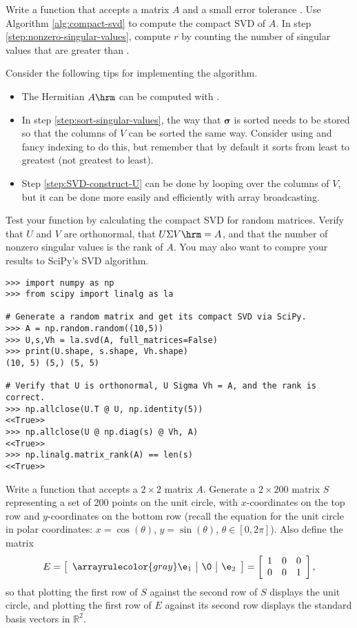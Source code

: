 Write a function that accepts a matrix $A$ and a small error tolerance .
Use Algorithm \ref{alg:compact-svd} to compute the compact SVD of $A$.
In step \ref{step:nonzero-singular-values}, compute $r$ by counting the number of singular values that are greater than .

Consider the following tips for implementing the algorithm.
\begin{itemize}
    \item The Hermitian $A\hrm$ can be computed with .
    \item In step \ref{step:sort-singular-values}, the way that $\boldsymbol{\sigma}$ is sorted needs to be stored so that the columns of $V$ can be sorted the same way.
    Consider using  and fancy indexing to do this, but remember that by default it sorts from least to greatest (not greatest to least).
    \item Step \ref{step:SVD-construct-U} can be done by looping over the columns of $V$, but it can be done more easily and efficiently with array broadcasting.
\end{itemize}

Test your function by calculating the compact SVD for random matrices.
Verify that $U$ and $V$ are orthonormal, that $U\Sigma V\hrm = A$, and that the number of nonzero singular values is the rank of $A$.
You may also want to compre your results to SciPy's SVD algorithm.
%
\begin{lstlisting}
>>> import numpy as np
>>> from scipy import linalg as la

# Generate a random matrix and get its compact SVD via SciPy.
>>> A = np.random.random((10,5))
>>> U,s,Vh = la.svd(A, full_matrices=False)
>>> print(U.shape, s.shape, Vh.shape)
(10, 5) (5,) (5, 5)

# Verify that U is orthonormal, U Sigma Vh = A, and the rank is correct.
>>> np.allclose(U.T @ U, np.identity(5))
<<True>>
>>> np.allclose(U @ np.diag(s) @ Vh, A)
<<True>>
>>> np.linalg.matrix_rank(A) == len(s)
<<True>>
\end{lstlisting}
\label{prob:calculate-compact-svd}
Write a function that accepts a $2 \times 2$ matrix $A$.
Generate a $2 \times 200$ matrix $S$ representing a set of 200 points on the unit circle, with $x$-coordinates on the top row and $y$-coordinates on the bottom row (recall the equation for the unit circle in polar coordinates:
$x = \cos(\theta)$, $y = \sin(\theta)$, $\theta\in[0,2\pi]$).
Also define the matrix
\[
E =
\left[\begin{array}{c|c|c}
\arrayrulecolor{gray}
\e_1 & \0 & \e_2
\end{array}\right]
=
\left[\begin{array}{ccc} 1 & 0 & 0 \\ 0 & 0 & 1 \end{array}\right],
\]
so that plotting the first row of $S$ against the second row of $S$ displays the unit circle, and plotting the first row of $E$ against its second row displays the standard basis vectors in $\mathbb{R}^2$.

